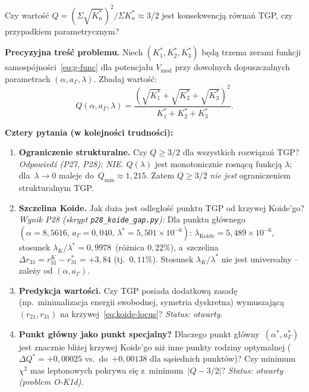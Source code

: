 \begin{problem}\label{oprob:koide}
Czy warto\'s\'c $Q = (\Sigma\sqrt{K^*_n})^2/\Sigma K^*_n \approx 3/2$
jest konsekwencj\k{a} r\'owna\'n TGP, czy przypadkiem parametrycznym?

\medskip
\textbf{Precyzyjna tre\'s\'c problemu.}
Niech $(K^*_1, K^*_2, K^*_3)$ b\k{e}d\k{a} trzema zerami funkcji
samospójno\'sci~\eqref{eq:g-func} dla potencja\l{}u $V_\mathrm{mod}$
przy dowolnych dopuszczalnych parametrach $(\alpha, a_\Gamma, \lambda)$.
Zbadaj warto\'s\'c:
\begin{equation}\label{eq:Q-def-open}
    Q(\alpha, a_\Gamma, \lambda)
    = \frac{(\sqrt{K^*_1}+\sqrt{K^*_2}+\sqrt{K^*_3})^2}
           {K^*_1+K^*_2+K^*_3}.
\end{equation}

\textbf{Cztery pytania (w kolejno\'sci trudno\'sci):}
\begin{enumerate}[label=\textbf{OK-\arabic*}]
    \item \textbf{Ograniczenie strukturalne.}
          Czy $Q \geq 3/2$ dla wszystkich rozwi\k{a}za\'n TGP?
          \textit{Odpowied\'z (P27, P28): NIE.}
          $Q(\lambda)$ jest monotonicznie rosn\k{a}c\k{a}
          funkcj\k{a} $\lambda$; dla~$\lambda \to 0$
          maleje do~$Q_{\min} \approx 1{,}215$. Zatem
          $Q \geq 3/2$ \emph{nie jest} ograniczeniem strukturalnym TGP.

    \item \textbf{Szczelina Koide.}
          Jak du\.za jest odleg\l{}o\'s\'c punktu TGP od krzywej
          Koide'go?
          \textit{Wynik P28 (skrypt \texttt{p28\_koide\_gap.py}):}
          Dla punktu g\l{}\'ownego $(\alpha=8{,}5616,\,
          a_\Gamma=0{,}040,\, \lambda^*=5{,}501\!\times\!10^{-6})$:
          $\lambda_\mathrm{Koide} = 5{,}489\!\times\!10^{-6}$,
          stosunek $\lambda_K/\lambda^* = 0{,}9978$~(r\'o\.znica $0{,}22\%$),
          a~szczelina $\Delta r_{31} = r_{31}^K - r_{31}^* = +3{,}84$
          (tj.\ $0{,}11\%$). Stosunek $\lambda_K/\lambda^*$ nie jest
          universalny -- zale\.zy od $(\alpha, a_\Gamma)$.

    \item \textbf{Predykcja warto\'sci.}
          Czy TGP posiada dodatkow\k{a} zasad\k{e}
          (np.\ minimalizacja energii swobodnej, symetria dyskretna)
          wymuszaj\k{a}c\k{a} $(r_{21}, r_{31})$ na krzywej~\eqref{eq:koide-locus}?
          \textit{Status: otwarty.}

    \item \textbf{Punkt g\l{}\'owny jako punkt specjalny?}
          Dlaczego punkt g\l{}\'owny~$(\alpha^*,a_\Gamma^*)$ jest
          znacznie bli\.zej krzywej Koide'go ni\.z inne punkty
          rodziny optymalnej ($\Delta Q^* = +0{,}00025$ vs.\
          do~$+0{,}00138$ dla s\k{a}siednich punkt\'ow)?
          Czy minimum $\chi^2$ mas leptonowych pokrywa si\k{e}
          z~minimum~$|Q-3/2|$?
          \textit{Status: otwarty (problem O-K1d).}
\end{enumerate}


\end{problem}

